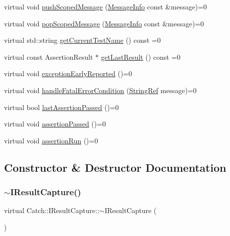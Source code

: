 \begin{DoxyCompactItemize}
virtual void \mbox{\hyperlink{structCatch_1_1IResultCapture_a91d154c1e087e383dcde5aad95cb6a05}{push\+Scoped\+Message}} (\mbox{\hyperlink{structCatch_1_1MessageInfo}{Message\+Info}} const \&message)=0
\item 
virtual void \mbox{\hyperlink{structCatch_1_1IResultCapture_a42bcb13276706bf8c3ce081ce16d37fd}{pop\+Scoped\+Message}} (\mbox{\hyperlink{structCatch_1_1MessageInfo}{Message\+Info}} const \&message)=0
\item 
virtual std\+::string \mbox{\hyperlink{structCatch_1_1IResultCapture_aea1617f4a84cc648246aa3ed6918b5bf}{get\+Current\+Test\+Name}} () const =0
\item 
virtual const Assertion\+Result $\ast$ \mbox{\hyperlink{structCatch_1_1IResultCapture_ab18872c89fab97405a56e9c6a4919736}{get\+Last\+Result}} () const =0
\item 
virtual void \mbox{\hyperlink{structCatch_1_1IResultCapture_ae63ecec95db4c236c63ecf616f483810}{exception\+Early\+Reported}} ()=0
\item 
virtual void \mbox{\hyperlink{structCatch_1_1IResultCapture_a48559e6598ba9474b903697b69c769b2}{handle\+Fatal\+Error\+Condition}} (\mbox{\hyperlink{classCatch_1_1StringRef}{String\+Ref}} message)=0
\item 
virtual bool \mbox{\hyperlink{structCatch_1_1IResultCapture_a973435fbdcb2f6f07a0ec5719a01e956}{last\+Assertion\+Passed}} ()=0
\item 
virtual void \mbox{\hyperlink{structCatch_1_1IResultCapture_a9b0ef2cb071e9a9dc6ec1b533026aea7}{assertion\+Passed}} ()=0
\item 
virtual void \mbox{\hyperlink{structCatch_1_1IResultCapture_ad4f4424484b803c24e84ac16e63c9086}{assertion\+Run}} ()=0
\end{DoxyCompactItemize}


\subsection{Constructor \& Destructor Documentation}
\mbox{\label{structCatch_1_1IResultCapture_a3bd16719d6772b7470887fc36c6d0808}} 
\subsubsection{\texorpdfstring{$\sim$\+I\+Result\+Capture()}{~IResultCapture()}}
{\footnotesize\ttfamily virtual Catch\+::\+I\+Result\+Capture\+::$\sim$\+I\+Result\+Capture (\begin{DoxyParamCaption}{ }\end{DoxyParamCaption})\hspace{0.3cm}{\ttfamily [virtual]}}



